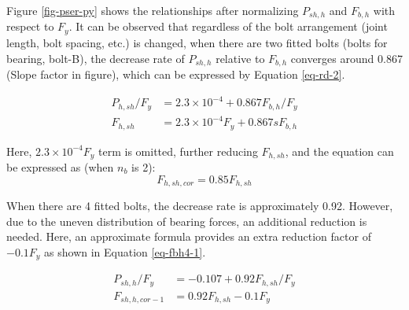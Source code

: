 Figure \ref{fig-pser-py} shows the relationships after normalizing $P_{sh,h}$ and $F_{b,h}$ with respect to $F_y$. It can be observed that regardless of the bolt arrangement (joint length, bolt spacing, etc.) is changed, when there are two fitted bolts (bolts for bearing, bolt-B), the decrease rate of $P_{sh,h}$ relative to $F_{b,h}$ converges around 0.867 (Slope factor in figure), which can be expressed by Equation \ref{eq-rd-2}.

\begin{equation}
\begin{aligned}
    P_{h,sh}/F_{y} &= 2.3\times10^{-4} + 0.867 F_{b,h} / F_y \\
        F_{h,sh} &= 2.3\times10^{-4} F_y + 0.867 sF_{b,h}
\end{aligned}
 \label{eq-rd-2}
\end{equation}

Here, $2.3\times10^{-4} F_y$ term is omitted, further reducing $F_{h,sh}$, and the equation can be expressed as (when $n_b$ is 2):
\begin{equation}
    F_{h,sh,cor} = 0.85 F_{h,sh}
    \label{eq-fbh2-1}
\end{equation}

When there are 4 fitted bolts, the decrease rate is approximately 0.92. However, due to the uneven distribution of bearing forces, an additional reduction is needed. Here, an approximate formula provides an extra reduction factor of $-0.1F_y$ as shown in Equation \ref{eq-fbh4-1}.

\begin{equation}
    \begin{aligned}
      P_{sh,h}/F_{y} & = -0.107 + 0.92 F_{h,sh} / F_y \\
      F_{sh,h,cor-1} &=  0.92 F_{h,sh} - 0.1 F_y
      \label{eq-fbh4-1}
    \end{aligned}
\end{equation}



